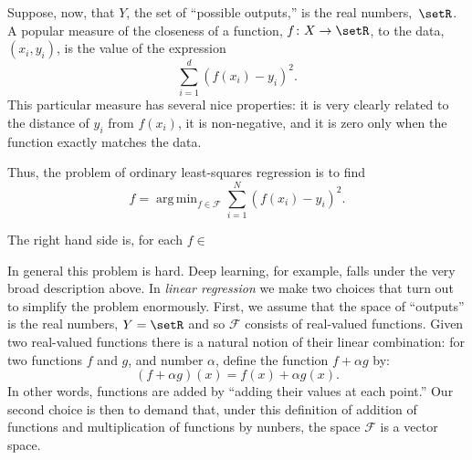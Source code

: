 \documentclass[10pt, a4paper]{article}
\DeclareMathOperator*{\argmin}{arg\,min}
\begin{document}
Suppose, now, that $Y$, the set of “possible outputs,” is the real
numbers,~$\setR$. A popular measure of the closeness of a function,
$f\colon X\to\setR$, to the data, $(x_i, y_i)$, is the value of the expression
\[
\sum_{i=1}^d{(f(x_i) - y_i)}^2.
\]
This particular measure has several nice properties: it is very
clearly related to the distance of $y_i$ from $f(x_i)$, it is
non-negative, and it is zero only when the function exactly matches
the data.




Thus,
the problem of ordinary least-squares regression is to find
\[
  \hat{f} = \argmin_{f\in\mathcal{F}} \sum_{i=1}^N {(f(x_i) - y_i)}^2.
\]

The right hand side is, for each $f\in$



In general this problem is hard. Deep learning, for example, falls
under the very broad description above. In \emph{linear regression} we
make two choices that turn out to simplify the problem enormously.
First, we assume that the space of “outputs” is the real numbers, $Y =
\setR$ and so $\mathcal{F}$ consists of real-valued functions. Given two
real-valued functions there is a natural notion of their linear
combination: for two functions $f$ and $g$, and number $\alpha$, define the
function $f+\alpha g$ by:
\begin{equation*}
  (f+\alpha g)(x) = f(x) + \alpha g(x).
\end{equation*}
In other words, functions are added by “adding their values at each
point.” Our second choice is then to demand that, under this
definition of addition of functions and multiplication of functions by
nunbers, the space $\mathcal{F}$ is a vector space.
\end{document}

